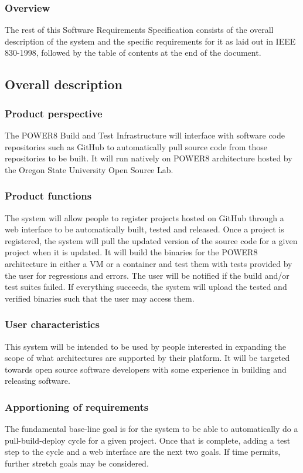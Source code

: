 \documentclass[10pt,letterpaper,onecolumn,draftclsnofoot]{IEEEtran}
\begin{document}
\subsubsection{Overview}
The rest of this Software Requirements Specification consists of the overall description of the system and the specific requirements for it as laid out in IEEE 830-1998, followed by the table of contents at the end of the document.

\subsection{Overall description}
\subsubsection{Product perspective}
The POWER8 Build and Test Infrastructure will interface with software code repositories such as GitHub to automatically pull source code from those repositories to be built. It will run natively on POWER8 architecture hosted by the Oregon State University Open Source Lab.
\subsubsection{Product functions}
The system will allow people to register projects hosted on GitHub through a web interface to be automatically built, tested and released. Once a project is registered, the system will pull the updated version of the source code for a given project when it is updated. It will build the binaries for the POWER8 architecture in either a VM or a container and test them with tests provided by the user for regressions and errors. The user will be notified if the build and/or test suites failed. If everything succeeds, the system will upload the tested and verified binaries such that the user may access them.
\subsubsection{User characteristics}
This system will be intended to be used by people interested in expanding the scope of what architectures are supported by their platform. It will be targeted towards open source software developers with some experience in building and releasing software.
\subsubsection{Apportioning of requirements}
The fundamental base-line goal is for the system to be able to automatically do a pull-build-deploy cycle for a given project. Once that is complete, adding a test step to the cycle and a web interface are the next two goals. If time permits, further stretch goals may be considered.
\end{document}
